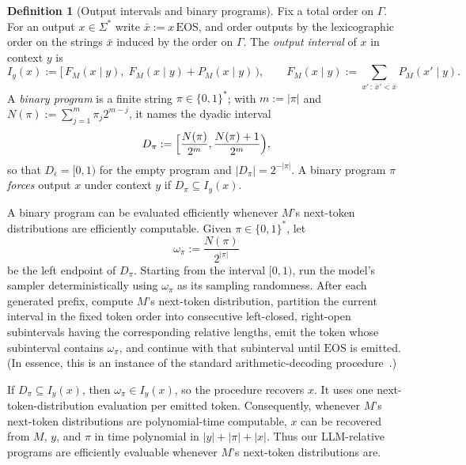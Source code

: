 \documentclass[letterpaper]{article} %
\theoremstyle{definition}
\newtheorem{definition}[theorem]{Definition}
\theoremstyle{remark}
\newcommand{\eps}{\epsilon}
\newcommand{\EOS}{\mathrm{EOS}}
\begin{document}
\begin{definition}[Output intervals and binary programs]\label{def:programs}
Fix a total order on $\Gamma$. For an output $x \in \Sigma^*$ write
$\bar x := x\,\EOS$, and order outputs by the lexicographic order on the strings
$\bar x$ induced by the order on $\Gamma$. The \emph{output interval} of $x$ in
context $y$ is
\begin{equation}\label{eq:interval}
I_y(x) := \bigl[\, F_M(x \mid y),\; F_M(x \mid y) + P_M(x \mid y) \,\bigr),
\qquad
F_M(x \mid y) := \!\!\sum_{x' \,:\, \bar{x}' < \bar x}\!\! P_M(x' \mid y).
\end{equation}
A \emph{binary program} is a finite string $\pi \in \{0,1\}^*$; with
$m := |\pi|$ and $N(\pi) := \sum_{j=1}^m \pi_j 2^{m-j}$, it names the dyadic
interval
\begin{equation}\label{eq:dyadic}
D_\pi := \Bigl[ \frac{N(\pi)}{2^m}, \frac{N(\pi)+1}{2^m} \Bigr),
\end{equation}
so that $D_\eps = [0,1)$ for the empty program and $|D_\pi| = 2^{-|\pi|}$.
A binary program $\pi$ \emph{forces} output $x$ under context $y$ if
$D_\pi \subseteq I_y(x)$. 
\end{definition}

A binary program can be evaluated efficiently whenever
\(M\)'s next-token distributions are efficiently computable.  Given
\(\pi\in\{0,1\}^*\), let
\[
  \omega_\pi:=\frac{N(\pi)}{2^{|\pi|}}
\]
be the left endpoint of \(D_\pi\).  Starting from the interval \([0,1)\), run
the model's sampler deterministically using \(\omega_\pi\) as its sampling
randomness.  After each generated prefix, compute \(M\)'s next-token
distribution, partition the current interval in the fixed token order into
consecutive left-closed, right-open subintervals having the corresponding
relative lengths, emit the token whose subinterval contains \(\omega_\pi\),
and continue with that subinterval until \(\EOS\) is emitted.  (In essence, this is an instance of the standard arithmetic-decoding procedure~\cite{WNC87}.)

If \(D_\pi\subseteq I_y(x)\), then \(\omega_\pi\in I_y(x)\), so the procedure
recovers \(x\).  It uses one next-token-distribution evaluation per emitted
token.  Consequently, whenever \(M\)'s next-token distributions are
polynomial-time computable, \(x\) can be recovered from \(M\), \(y\), and
\(\pi\) in time polynomial in \(|y|+|\pi|+|x|\).  Thus our LLM-relative
programs are efficiently evaluable whenever \(M\)'s next-token distributions
are.
\end{document}
